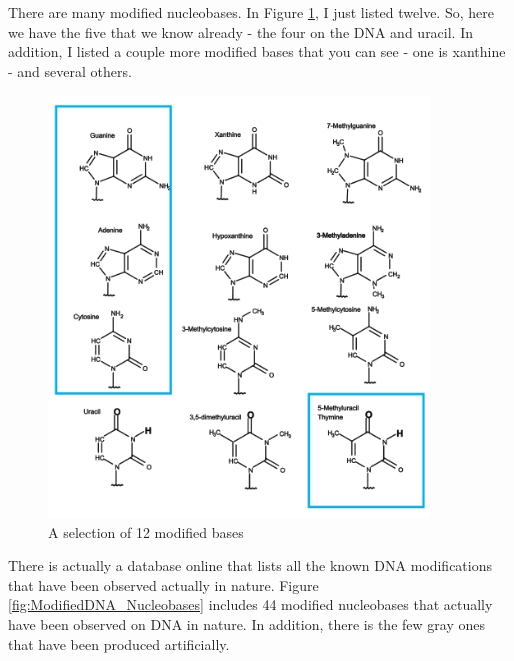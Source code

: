 \documentclass[]{article}
\begin{document}
There are many modified nucleobases.
In Figure \ref{fig:ModifiedBases}, I just listed twelve. So, here we have the five
that we know already - the four on the DNA and uracil.
In addition, I listed a couple more modified bases that you can see - one is xanthine - and several others.

\begin{figure}[H]
	\caption{A selection of 12 modified bases}\label{fig:ModifiedBases} 
	\includegraphics[width=0.9\textwidth]{ModifiedBases}
\end{figure}


There is actually a database online
that lists
all the known DNA modifications
that have been observed
actually in nature.
Figure \ref{fig:ModifiedDNA_Nucleobases} includes 44 modified nucleobases
that actually have been observed
on DNA in nature.
In addition, there is the few gray ones
that have been produced artificially.
\end{document}
